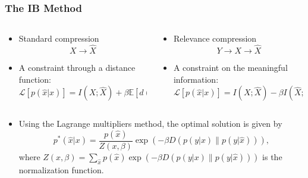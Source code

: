 \documentclass{beamer}
\begin{document}
\begin{frame}
    \frametitle{The IB Method \cite{IB-method}}
    \begin{columns}[T]
        \begin{column}{0.5\textwidth}
            \begin{itemize}
                \item Standard compression
                \begin{equation*}
                    X\to \hat{X}
                \end{equation*}
                \item A constraint through a distance function:
                \begin{equation*}
                    \mathcal{L}\left[p\left(\hat{x}|x\right)\right] \!=\! I(X;\hat{X}) + \beta \mathbb{E}\left[d\left(x,\hat{x}\right)\right]
                \end{equation*}
            \end{itemize}
        \end{column}
        \begin{column}{0.5\textwidth}
            \begin{itemize}
                \item Relevance compression
                \begin{equation*}
                    Y\to X\to \hat{X}
                \end{equation*}
                \item A constraint on the meaningful information:
                \begin{equation*}
                    \mathcal{L}\left[p\left(\hat{x}|x\right)\right] \!=\! I(X;\hat{X}) - \beta I(\hat{X};Y)
                \end{equation*}
            \end{itemize}
        \end{column}
    \end{columns}
    \hspace{1cm}
    \begin{itemize}
        \item Using the Lagrange multipliers method, the optimal solution is given by
        \begin{equation}
            p^*(\hat{x}|x) = \frac{p(\hat{x})}{Z(x, \beta)} \exp\left(-\beta D\left(p(y|x)\|p(y|\hat{x})\right)\right),
        \end{equation}
        where $Z(x, \beta)=\sum_{\hat{x}}p(\hat{x})\exp\left(-\beta D\left(p(y|x)\|p(y|\hat{x})\right)\right)$ is the normalization function.
    \end{itemize}
\end{frame}
\end{document}
